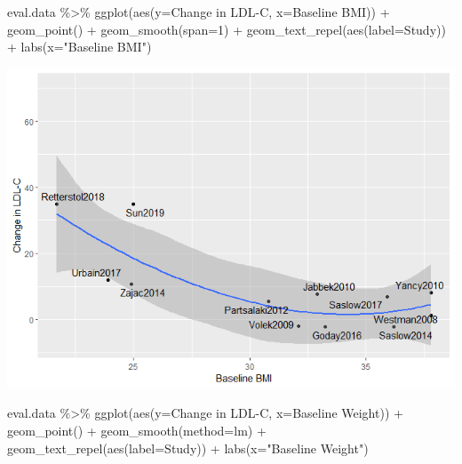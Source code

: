 \documentclass[
]{article}
\newenvironment{Shaded}{\begin{snugshade}}{\end{snugshade}}
\newcommand{\AttributeTok}[1]{\textcolor[rgb]{0.77,0.63,0.00}{#1}}
\newcommand{\DecValTok}[1]{\textcolor[rgb]{0.00,0.00,0.81}{#1}}
\newcommand{\FunctionTok}[1]{\textcolor[rgb]{0.00,0.00,0.00}{#1}}
\newcommand{\NormalTok}[1]{#1}
\newcommand{\SpecialCharTok}[1]{\textcolor[rgb]{0.00,0.00,0.00}{#1}}
\newcommand{\StringTok}[1]{\textcolor[rgb]{0.31,0.60,0.02}{#1}}
\begin{document}
\begin{Shaded}
\begin{Highlighting}[]
\NormalTok{eval.data }\SpecialCharTok{\%\textgreater{}\%}
  \FunctionTok{ggplot}\NormalTok{(}\FunctionTok{aes}\NormalTok{(}\AttributeTok{y=}\StringTok{\textasciigrave{}}\AttributeTok{Change in LDL{-}C}\StringTok{\textasciigrave{}}\NormalTok{,}
             \AttributeTok{x=}\StringTok{\textasciigrave{}}\AttributeTok{Baseline BMI}\StringTok{\textasciigrave{}}\NormalTok{)) }\SpecialCharTok{+}
  \FunctionTok{geom\_point}\NormalTok{() }\SpecialCharTok{+}
  \FunctionTok{geom\_smooth}\NormalTok{(}\AttributeTok{span=}\DecValTok{1}\NormalTok{) }\SpecialCharTok{+}
  \FunctionTok{geom\_text\_repel}\NormalTok{(}\FunctionTok{aes}\NormalTok{(}\AttributeTok{label=}\NormalTok{Study)) }\SpecialCharTok{+}
  \FunctionTok{labs}\NormalTok{(}\AttributeTok{x=}\StringTok{"Baseline BMI"}\NormalTok{)}
\end{Highlighting}
\end{Shaded}

\includegraphics{figures/ldl-change-vs-weight-2.png}

\begin{Shaded}
\begin{Highlighting}[]
\NormalTok{eval.data }\SpecialCharTok{\%\textgreater{}\%}
  \FunctionTok{ggplot}\NormalTok{(}\FunctionTok{aes}\NormalTok{(}\AttributeTok{y=}\StringTok{\textasciigrave{}}\AttributeTok{Change in LDL{-}C}\StringTok{\textasciigrave{}}\NormalTok{,}
             \AttributeTok{x=}\StringTok{\textasciigrave{}}\AttributeTok{Baseline Weight}\StringTok{\textasciigrave{}}\NormalTok{)) }\SpecialCharTok{+}
  \FunctionTok{geom\_point}\NormalTok{() }\SpecialCharTok{+}
  \FunctionTok{geom\_smooth}\NormalTok{(}\AttributeTok{method=}\StringTok{\textquotesingle{}lm\textquotesingle{}}\NormalTok{) }\SpecialCharTok{+}
  \FunctionTok{geom\_text\_repel}\NormalTok{(}\FunctionTok{aes}\NormalTok{(}\AttributeTok{label=}\NormalTok{Study)) }\SpecialCharTok{+}
  \FunctionTok{labs}\NormalTok{(}\AttributeTok{x=}\StringTok{"Baseline Weight"}\NormalTok{)}
\end{Highlighting}
\end{Shaded}
\end{document}
